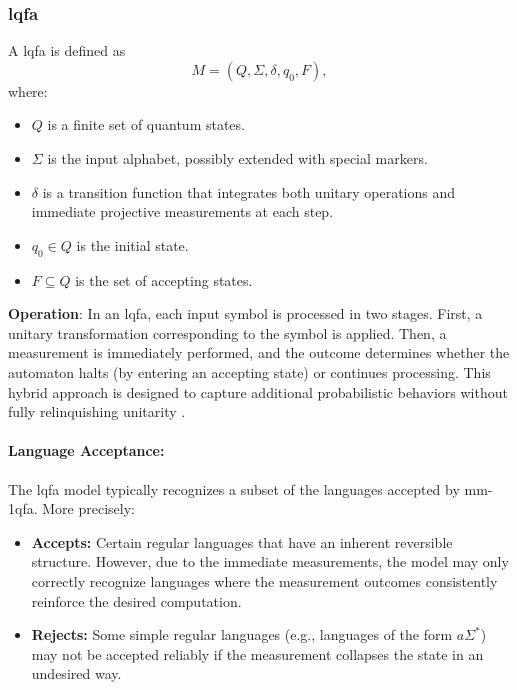 \subsubsection{\gls{lqfa}}
\label{sssec:lqfa}
\begin{definition}
A \gls{lqfa} is defined as 
\[
M = (Q, \Sigma, \delta, q_0, F),
\]
where:
\begin{itemize}
    \item \( Q \) is a finite set of quantum states.
    \item \( \Sigma \) is the input alphabet, possibly extended with special markers.
    \item \( \delta \) is a transition function that integrates both unitary operations and immediate projective measurements at each step.
    \item \( q_0 \in Q \) is the initial state.
    \item \( F \subseteq Q \) is the set of accepting states.
\end{itemize}
\end{definition}

\textbf{Operation}:  
In an \gls{lqfa}, each input symbol is processed in two stages. First, a unitary transformation corresponding to the symbol is applied. Then, a measurement is immediately performed, and the outcome determines whether the automaton halts (by entering an accepting state) or continues processing. This hybrid approach is designed to capture additional probabilistic behaviors without fully relinquishing unitarity \cite{ambainis2002quantum}.

\paragraph{Language Acceptance:}  
The \gls{lqfa} model typically recognizes a subset of the languages accepted by \gls{mm-1qfa}. More precisely:
\begin{itemize}
    \item \textbf{Accepts:} Certain regular languages that have an inherent reversible structure. However, due to the immediate measurements, the model may only correctly recognize languages where the measurement outcomes consistently reinforce the desired computation.
    \item \textbf{Rejects:} Some simple regular languages (e.g., languages of the form \( a\Sigma^* \)) may not be accepted reliably if the measurement collapses the state in an undesired way.
\end{itemize}

